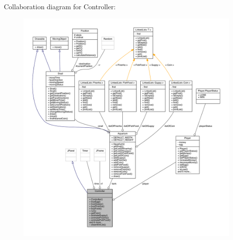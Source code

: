 Collaboration diagram for Controller\+:
\nopagebreak
\begin{figure}[H]
\begin{center}
\leavevmode
\includegraphics[width=350pt]{class_controller__coll__graph}
\end{center}
\end{figure}

